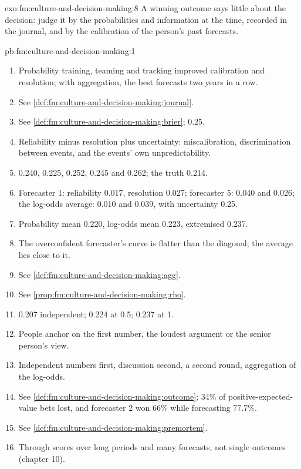 \begin{solution}{exo:fm:culture-and-decision-making:8}
A winning outcome says little about the decision: judge it by the probabilities and information at the time, recorded in the journal, and by the
calibration of the person's past forecasts.
\end{solution}

\begin{solution}{pb:fm:culture-and-decision-making:1}
\begin{enumerate}
\item Probability training, teaming and tracking improved calibration and resolution; with aggregation, the best forecasts two years in a row.
\item See \cref{def:fm:culture-and-decision-making:journal}.
\item See \cref{def:fm:culture-and-decision-making:brier}; 0.25.
\item Reliability minus resolution plus uncertainty: miscalibration, discrimination between events, and the events' own unpredictability.
\item 0.240, 0.225, 0.252, 0.245 and 0.262; the truth 0.214.
\item Forecaster 1: reliability 0.017, resolution 0.027; forecaster 5: 0.040 and 0.026; the log-odds average: 0.010 and 0.039, with uncertainty 0.25.
\item Probability mean 0.220, log-odds mean 0.223, extremised 0.237.
\item The overconfident forecaster's curve is flatter than the diagonal; the average lies close to it.
\item See \cref{def:fm:culture-and-decision-making:agg}.
\item See \cref{prop:fm:culture-and-decision-making:rho}.
\item 0.207 independent; 0.224 at 0.5; 0.237 at 1.
\item People anchor on the first number, the loudest argument or the senior person's view.
\item Independent numbers first, discussion second, a second round, aggregation of the log-odds.
\item See \cref{def:fm:culture-and-decision-making:outcome}; 34\% of positive-expected-value bets lost, and forecaster 2 won 66\% while forecasting
77.7\%.
\item See \cref{def:fm:culture-and-decision-making:premortem}.
\item Through scores over long periods and many forecasts, not single outcomes (chapter 10).

\end{enumerate}
\end{solution}

